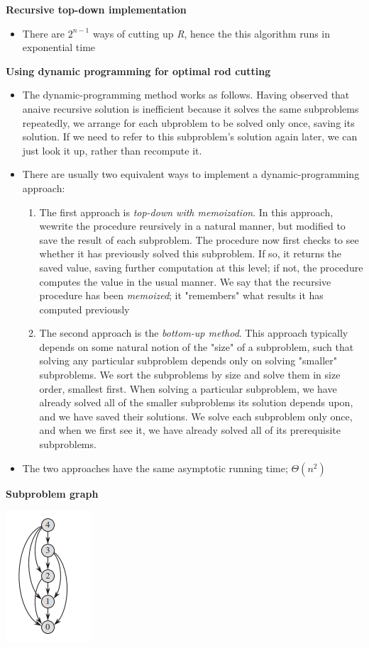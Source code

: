 \documentclass{report}
\begin{document}
\textbf{Recursive top-down implementation}
\begin{itemize}
    \item There are $2^{n - 1}$ ways of cutting up \textit{R}, hence the this algorithm runs in exponential time
\end{itemize}
\textbf{Using dynamic programming for optimal rod cutting}
\begin{itemize}
    \item The dynamic-programming method works as follows. Having observed that anaive recursive solution is inefficient because it solves the same subproblems repeatedly, we arrange for each ubproblem to be solved only once, saving its solution. If we need to refer to this subproblem's solution again later, we can just look it up, rather than recompute it.
    \item There are usually two equivalent ways to implement a dynamic-programming approach:
    \begin{enumerate}
        \item The first approach is \textit{top-down with memoization}. In this approach, wewrite the procedure reursively in a natural manner, but modified to save the result of each subproblem. The procedure now first checks to see whether it has previously solved this subproblem. If so, it returns the saved value, saving further computation at this level; if not, the procedure computes the value in the usual manner. We say that the recursive procedure has been \textit{memoized}; it "remembers" what results it has computed previously
        \item The second approach is the \textit{bottom-up method}. This approach typically depends on some natural notion of the "size" of a subproblem, such that solving any particular subproblem depends only on solving "smaller" subproblems. We sort the subproblems by size and solve them in size order, smallest first. When solving a particular subproblem, we have already solved all of the smaller subproblems its solution depends upon, and we have saved their solutions. We solve each subproblem only once, and when we first see it, we have already solved all of its prerequisite subproblems.
    \end{enumerate}
    \item The two approaches have the same asymptotic running time; $\Theta(n^2)$
\end{itemize}
\textbf{Subproblem graph}
\begin{center}
    \includegraphics[height = 5 cm]{../entities/subproblem_graph.png}
\end{center}
\end{document}
